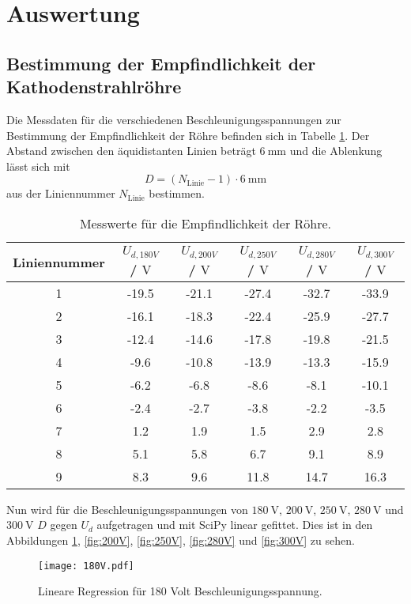 \section{Auswertung}
\label{sec:Auswertung}
\subsection{Bestimmung der Empfindlichkeit der  Kathodenstrahlröhre}
\FloatBarrier
Die Messdaten für die verschiedenen Beschleunigungsspannungen zur Bestimmung der Empfindlichkeit der Röhre befinden sich in Tabelle \ref{tab:empf}.
Der Abstand zwischen den äquidistanten Linien beträgt $\SI{6}{\milli\metre}$ und die Ablenkung lässt sich mit
\begin{equation}
  D= (N_{\text{Linie}}-1) \cdot \SI{6}{\milli\metre}
  \label{eqn:linie}
\end{equation}
aus der Liniennummer $N_{\text{Linie}}$ bestimmen.
\begin{table}
  \centering
  \caption{Messwerte für die Empfindlichkeit der Röhre.}
  \label{tab:empf}
  \begin{tabular}[t]{c c c c c c}
   \toprule
   Liniennummer & $U_{d,180V}$ / $\si{\volt}$ & $U_{d,200V}$ / $\si{\volt}$ & $U_{d,250V}$ / $\si{\volt}$ & $U_{d,280V}$ / $\si{\volt}$ & $U_{d,300V}$ / $\si{\volt}$ \\
   \midrule
   1& -19.5 & -21.1& -27.4& -32.7& -33.9 \\
   2& -16.1 & -18.3& -22.4& -25.9& -27.7 \\
   3& -12.4 & -14.6& -17.8& -19.8& -21.5 \\
   4& -9.6 & -10.8 & -13.9& -13.3& -15.9 \\
   5& -6.2 & -6.8  & -8.6 & -8.1 & -10.1 \\
   6& -2.4 & -2.7  & -3.8 & -2.2 & -3.5  \\
   7& 1.2 & 1.9    & 1.5  & 2.9  & 2.8   \\
   8& 5.1 & 5.8    & 6.7  & 9.1  & 8.9   \\
   9& 8.3 & 9.6    & 11.8 & 14.7 & 16.3  \\
   \bottomrule
   \end{tabular}
 \end{table}
Nun wird für die Beschleunigungsspannungen von $\SI{180}{\volt}$, $\SI{200}{\volt}$, $\SI{250}{\volt}$, $\SI{280}{\volt}$ und $\SI{300}{\volt}$ $D$ gegen $U_d$
aufgetragen und mit SciPy linear gefittet. Dies ist in den Abbildungen \ref{fig:180V}, \ref{fig:200V}, \ref{fig:250V}, \ref{fig:280V} und \ref{fig:300V} zu sehen.
\begin{figure}
  \centering
  \texttt{[image: 180V.pdf]}
  \caption{Lineare Regression für 180 Volt Beschleunigungsspannung.}
  \label{fig:180V}
\end{figure}
